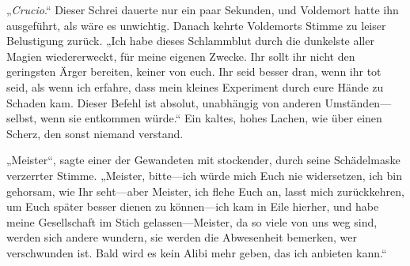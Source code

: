 „\emph{Crucio}.“
Dieser Schrei dauerte nur ein paar Sekunden, und Voldemort hatte ihn ausgeführt, als wäre es unwichtig. Danach kehrte Voldemorts Stimme zu leiser Belustigung zurück.
„Ich habe dieses Schlammblut durch die dunkelste aller Magien wiedererweckt, für meine eigenen Zwecke. Ihr sollt ihr nicht den geringsten Ärger bereiten, keiner von euch. Ihr seid besser dran, wenn ihr tot seid, als wenn ich erfahre, dass mein kleines Experiment durch eure Hände zu Schaden kam. Dieser Befehl ist absolut, unabhängig von anderen Umständen—selbst, wenn sie entkommen würde.“
Ein kaltes, hohes Lachen, wie über einen Scherz, den sonst niemand verstand.

„Meister“, sagte einer der Gewandeten mit stockender, durch seine Schädelmaske verzerrter Stimme. „Meister, bitte—ich würde mich Euch nie widersetzen, ich bin gehorsam, wie Ihr seht—aber Meister, ich flehe Euch an, lasst mich zurückkehren, um Euch später besser dienen zu können—ich kam in Eile hierher, und habe meine Gesellschaft im Stich gelassen—Meister, da so viele von uns weg sind, werden sich andere wundern, sie werden die Abwesenheit bemerken, wer verschwunden ist. Bald wird es kein Alibi mehr geben, das ich anbieten kann.“

